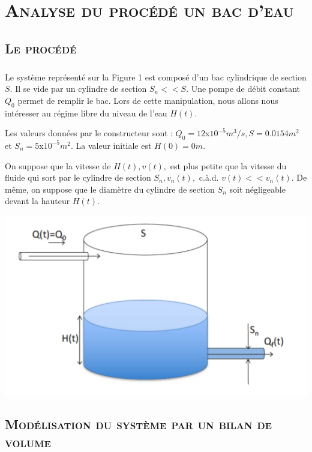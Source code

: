 \chapter{\textsc{Analyse du procédé un bac d'eau}}
\section{\textsc{Le procédé}}
 
 	\paragraph{} Le système représenté sur la Figure 1 est composé d’un bac cylindrique de section $S$. Il se vide par un cylindre de section $S_n << S$. Une pompe de débit constant $Q_0$ permet de remplir le bac. Lors de cette manipulation, nous allons nous intéresser au régime libre du niveau de l’eau $H(t)$.
\par Les valeurs données par le constructeur sont : $Q_0 = 12$x$10^{-5}m^3/s, S = 0.0154m^2$ et $S_n = 5$x$ 10^{-5} m^2$. La valeur initiale est $H(0) = 0m$.
\par On suppose que la vitesse de $H(t), v(t),$ est plus petite que la vitesse du fluide qui sort par le cylindre de
section $S_n , v_n (t),$ c.à.d. $v(t) << v_n (t)$. De même, on suppose que le diamètre du cylindre de section $S_n$ soit négligeable devant la hauteur $H(t)$.
	
	\begin{center}
	\includegraphics[scale=0.5]{1bac.png}
	\label{fig1} 
	\end{center}   

\break

\section{\textsc{Modélisation du système par un bilan de volume }}

